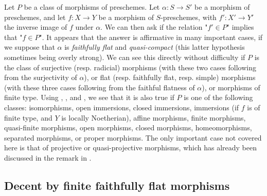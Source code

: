 Let $P$ be a class of morphisms of preschemes.
Let $\alpha\colon S\to S'$ be a morphism of preschemes, and let $f\colon X\to Y$ be a morphism of $S$-preschemes, with $f'\colon X'\to Y'$ the inverse image of $f$ under $\alpha$.
We can then ask if the relation "$f'\in P$" implies that "$f\in P$".
It appears that the answer is affirmative in many important cases, if we suppose that $\alpha$ is \emph{faithfully flat} and \emph{quasi-compact} (this latter hypothesis sometimes being overly strong).
We can see this directly without difficulty if $P$ is the class of surjective (resp. radicial) morphisms (with these two cases following from the surjectivity of $\alpha$), or flat (resp. faithfully flat, resp. simple) morphisms (with these three cases following from the faithful flatness of $\alpha$), or morphisms of finite type.
Using , , and , we see that it is also true if $P$ is one of the following classes:
isomorphisms, open immersions, closed immersions, immersions (if $f$ is of finite type, and $Y$ is locally Noetherian), affine morphisms, finite morphisms, quasi-finite morphisms, open morphisms, closed morphisms, homeomorphisms, separated morphisms, or proper morphisms.
The only important case not covered here is that of projective or quasi-projective morphisms, which has already been discussed in the remark in .


\subsection{Decent by finite faithfully flat morphisms}\label{fga3.i-b.3}

